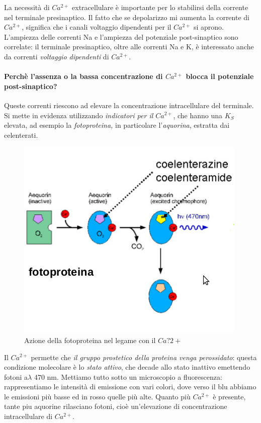 \documentclass[a4paper,12pt]{article}
\begin{document}
La necessità di $Ca^{2+}$ extracellulare è importante per lo stabilirsi della corrente nel terminale presinaptico. Il fatto che se depolarizzo mi aumenta la corrente di $Ca^{2+}$, significa che i canali voltaggio dipendenti per il $Ca^{2+}$ si aprono. L'ampiezza delle correnti Na e l'ampiezza del potenziale post-sinaptico sono correlate: il terminale presinaptico, oltre alle correnti Na e K, è interessato anche da correnti \emph{voltaggio dipendenti} di $Ca^{2+}$.

\paragraph{Perchè l'assenza o la bassa concentrazione di $Ca^{2+}$ blocca il potenziale post-sinaptico?}
Queste correnti riescono ad elevare la concentrazione intracellulare del terminale. Si mette in evidenza utilizzando \emph{indicatori per il $Ca^{2+}$}, che hanno una $K_{S}$ elevata, ad esempio la \emph{fotoproteina,} in particolare l'\emph{aquorina}, estratta dai celenterati. 

\begin{figure}[H]
\centering
\includegraphics[scale=0.5]{immagine/fotoproteina.jpg}
\caption{Azione della fotoproteina nel legame con il $Ca?{2+}$}
\end{figure}
Il $Ca^{2+}$ permette che \emph{il gruppo prostetico della proteina venga perossidato}: questa condizione molecolare è lo \emph{stato attivo}, che decade allo stato inattivo emettendo fotoni a$\lambda$ 470 nm. Mettiamo tutto sotto un microscopio a fluorescenza: rappresentiamo le intensità di emissione con vari colori, dove verso il blu abbiamo le emissioni più basse ed in rosso quelle più alte. Quanto più $Ca^{2+}$ è presente, tante piu aquorine rilasciano fotoni, cioè un'elevazione di concentrazione intracellulare di $Ca^{2+}$.
\end{document}
